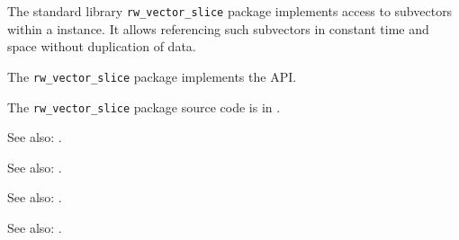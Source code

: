 
The standard library {\tt rw\_vector\_slice} package implements access to subvectors within a 
 instance.  It allows referencing such subvectors in 
constant time and space without duplication of data.

The {\tt rw\_vector\_slice} package implements the  API.

The {\tt rw\_vector\_slice} package source code is in .


See also: .

See also: .

See also: .

See also: .




